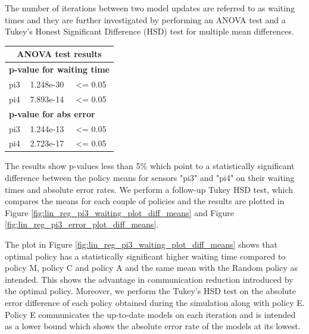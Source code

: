 \documentclass{mpaper}
\begin{document}
The number of iterations between two model updates are referred to as waiting times and they are further investigated by performing an ANOVA test and a Tukey's Honest Significant Difference (HSD) test for multiple mean differences. 

\begin{table}[h]
\centering
\begin{tabular}{|l|l|l|}
\hline
\multicolumn{3}{|c|}{\cellcolor[HTML]{DAE8FC}\textbf{ANOVA test results}}       \\ \hline
\multicolumn{3}{|l|}{\cellcolor[HTML]{FFFFFF}\textbf{p-value for waiting time}} \\ \hline
pi3           & 1.248e-30         & \textless{}= 0.05                           \\ \hline
pi4           & 7.893e-14         & \textless{}= 0.05                           \\ \hline
\multicolumn{3}{|l|}{\cellcolor[HTML]{FFFFFF}\textbf{p-value for abs error}}    \\ \hline
pi3           & 1.244e-13         & \textless{}= 0.05                           \\ \hline
pi4           & 2.723e-17         & \cellcolor[HTML]{FFFFFF}\textless{}= 0.05   \\ \hline
\end{tabular}
\end{table}

The results show p-values less than 5\% which point to a statistically significant difference between the policy means for sensors "pi3" and "pi4" on their waiting times and absolute error rates. We perform a follow-up Tukey HSD test, which compares the means for each couple of policies and the results are plotted in Figure \ref{fig:lin_reg_pi3_waiting_plot_diff_means} and Figure \ref{fig:lin_reg_pi3_error_plot_diff_means}.

The plot in Figure \ref{fig:lin_reg_pi3_waiting_plot_diff_means} shows that optimal policy has a statistically significant higher waiting time compared to policy M, policy C and policy A and the same mean with the Random policy as intended.
This shows the advantage in communication reduction introduced by the optimal policy.
Moreover, we perform the Tukey's HSD test on the absolute error difference of each policy obtained during the simulation along with policy E. Policy E communicates the up-to-date models on each iteration and is intended as a lower bound which shows the absolute error rate of the models at its lowest. 
\end{document}
